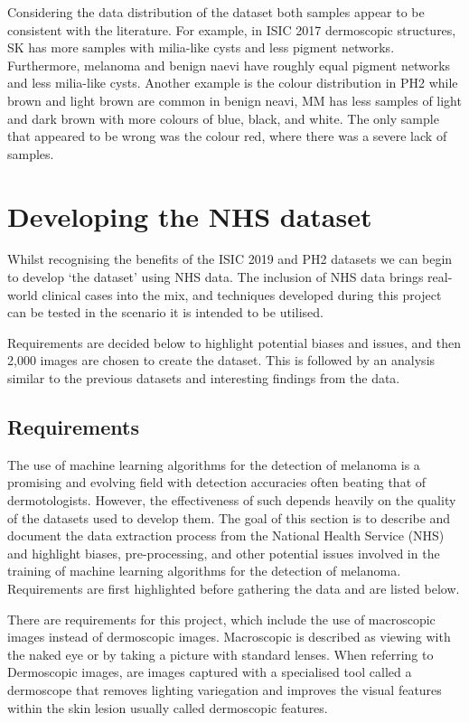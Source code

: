 Considering the data distribution of the dataset both samples appear to be consistent with the literature. For example, in ISIC 2017 dermoscopic structures, SK has more samples with milia-like cysts and less pigment networks. Furthermore, melanoma and benign naevi have roughly equal pigment networks and less milia-like cysts. Another example is the colour distribution in PH2 while brown and light brown are common in benign neavi, MM has less samples of light and dark brown with more colours of blue, black, and white. The only sample that appeared to be wrong was the colour red, where there was a severe lack of samples.

\section{Developing the NHS dataset}
Whilst recognising the benefits of the ISIC 2019 and PH2 datasets we can begin to develop `the dataset' using NHS data. The inclusion of NHS data brings real-world clinical cases into the mix, and techniques developed during this project can be tested in the scenario it is intended to be utilised.

Requirements are decided below to highlight potential biases and issues, and then 2,000 images are chosen to create the dataset. This is followed by an analysis similar to the previous datasets and interesting findings from the data.

\subsection{Requirements}
The use of machine learning algorithms for the detection of melanoma is a promising and evolving field with detection accuracies often beating that of dermotologists\cite{Andre2017}. However, the effectiveness of such depends heavily on the quality of the datasets used to develop them\cite{Tae2019}. The goal of this section is to describe and document the data extraction process from the National Health Service (NHS) and highlight biases, pre-processing, and other potential issues involved in the training of machine learning algorithms for the detection of melanoma. Requirements are first highlighted before gathering the data and are listed below.

There are requirements for this project, which include the use of macroscopic images instead of dermoscopic images. Macroscopic is described as viewing with the naked eye or by taking a picture with standard lenses. When referring to Dermoscopic images, are images captured with a specialised tool called a dermoscope that removes lighting variegation and improves the visual features within the skin lesion usually called dermoscopic features.

